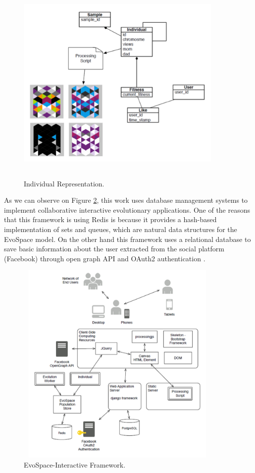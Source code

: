 \begin{figure}
	\captionsetup{justification=centering,margin=2cm}
	\centering
	\setlength\fboxsep{0pt}
	\setlength\fboxrule{0.7pt}
	\includegraphics[width=10cm,height=10cm,keepaspectratio]{img/individualRep.png}
	\caption{Individual Representation.}
	\label{fig:individualRep}
\end{figure}

As we can observe on Figure \ref{fig:ESFramework1}, this work uses database
management systems to implement collaborative interactive evolutionary
applications. One of the reasons that this framework is using Redis \cite{redis} is
because it provides a hash-based implementation of sets and queues, which are
natural data structures for the EvoSpace model. On the other hand this framework
uses a relational database to save basic information about the user extracted
from the social platform (Facebook) through open graph API and OAuth2
authentication \cite{facebook}.
\begin{figure}
	\captionsetup{justification=centering,margin=2cm}
	\centering
	\setlength\fboxsep{0pt}
	\setlength\fboxrule{0.7pt}
	\includegraphics[width=10cm,height=10cm,keepaspectratio]{img/ESFramework.png}
	\caption{EvoSpace-Interactive Framework.}
	\label{fig:ESFramework1}
\end{figure}

